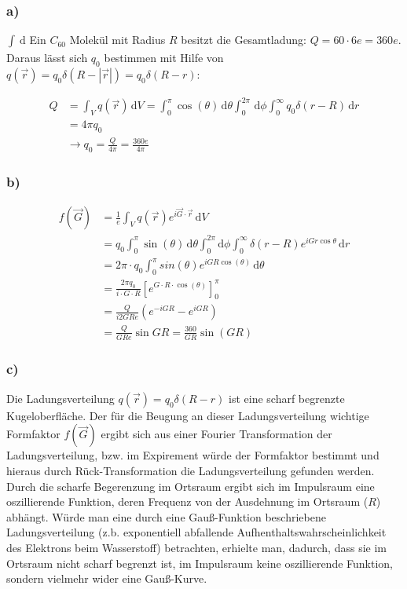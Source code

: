 \documentclass[11pt]{article}
\begin{document}
\subsubsection*{a)}
$\int_{}^{} \! \, \mathrm{d}$
Ein $C_60$ Molekül mit Radius $R$ besitzt die Gesamtladung: $Q=60\cdot 6e=360e$. Daraus lässt sich $q_0$ bestimmen mit Hilfe von $q(\vec{r})=q_0\delta(R-|\vec{r}|) = q_0\delta(R-r)$:

\begin{align*}
Q   &= \int_{V}^{} \! q(\vec{r})\, \mathrm{d}V = \int_{0}^{\pi} \! \cos(\theta)\, \mathrm{d}\theta\int_{0}^{2\pi} \! \, \mathrm{d}\phi \int_{0}^{\infty} \! q_0\delta(r-R)\, \mathrm{d}r\\
    &= 4\pi q_0\\
    &\rightarrow q_0 = \frac{Q}{4\pi}=\frac{360e}{4\pi}
\end{align*}
\subsubsection*{b)}
\begin{align*}
f(\vec{G})  &= \frac{1}{e}\int_{V}^{} \! q(\vec{r})e^{i\vec{G}\cdot\vec{r}}\, \mathrm{d}V \\
            &=q_0\int_{0}^{\pi} \! \sin(\theta)\, \mathrm{d}\theta  \int_{0}^{2\pi} \! \mathrm{d}\phi \int_{0}^{\infty} \! \delta(r-R)e^{iGr\cos{\theta}}\, \mathrm{d}r\\
            &= 2\pi\cdot q_0\int_{0}^{\pi} \! sin(\theta)e^{iGR\cos(\theta)}\, \mathrm{d}\theta\\
            &=\frac{2\pi q_0}{i\cdot G\cdot R}\left[e^{G\cdot R\cdot\cos(\theta)}\right]_{0}^{\pi}\\
            &=\frac{Q}{i2GRe}(e^{-iGR}-e^{iGR})\\
            &=\frac{Q}{GRe}\sin{GR} = \frac{360}{GR}\sin(GR)
\end{align*}
\subsubsection*{c)}
Die Ladungsverteilung $q(\vec{r}) = q_0\delta(R-r)$ ist eine scharf begrenzte Kugeloberfläche. Der für die Beugung an dieser Ladungsverteilung wichtige Formfaktor $f(\vec{G})$ ergibt sich aus einer Fourier Transformation der Ladungsverteilung, 
bzw. im Expirement würde der Formfaktor bestimmt und hieraus durch Rück-Transformation die Ladungsverteilung gefunden werden. Durch die scharfe Begerenzung im Ortsraum ergibt sich im Impulsraum eine oszillierende Funktion, deren Frequenz von der Ausdehnung im Ortsraum ($R$) abhängt. 
Würde man eine durch eine Gauß-Funktion beschriebene Ladungsverteilung (z.b. exponentiell abfallende Aufhenthaltswahrscheinlichkeit des Elektrons beim Wasserstoff) betrachten, erhielte man, dadurch, dass sie im Ortsraum nicht scharf begrenzt ist, im Impulsraum keine oszillierende
Funktion, sondern vielmehr wider eine Gauß-Kurve.
\end{document}

